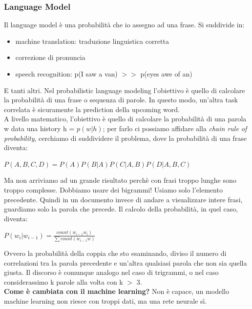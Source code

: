 \subsubsection{Language Model}
Il language model è una probabilità che io assegno ad una frase. Si suddivide in:
\begin{itemize}
    \item machine translation: traduzione linguistica corretta
    \item correzione di pronuncia 
    \item speech recognition: p(I saw a van) $>>$ p(eyes awe of an)
\end{itemize}
E tanti altri. Nel probabilistic language modeling l'obiettivo è quello di calcolare la probabilità di una frase o sequenza di parole. In questo modo, un'altra task correlata è sicuramente la prediction della upcoming word. 
\\
A livello matematico, l'obiettivo è quello di calcolare la probabilità di una parola w data una history h = $p(w|h)$; per farlo ci possiamo affidare alla \textit{chain rule of probability}, cerchiamo di suddividere il problema, dove la probabilità di una frase diventa:
\begin{center}
    \begin{math}
        P(A,B,C,D) = P(A)P(B|A)P(C|A,B)P(D|A,B,C)
    \end{math}
\end{center}
Ma non arriviamo ad un grande risultato perchè con frasi troppo lunghe sono troppo complesse. Dobbiamo usare dei bigrammi! Usiamo solo l'elemento precedente. Quindi in un documento invece di andare a visualizzare intere frasi, guardiamo solo la parola che precede. Il calcolo della probabilità, in quel caso, diventa: 
\begin{center}
    \begin{math}
        P(w_i | w_{i-1}) = \frac{count(w_{i-1}w_i)}{\sum count(w_{i-1}w)}
    \end{math}
\end{center}
Ovvero la probabilità della coppia che sto esaminando, diviso il numero di correlazioni tra la parola precedente e un'altra qualsiasi parola che non sia quella giusta. Il discorso è comunque analogo nel caso di trigrammi, o nel caso considerassimo k parole alla volta con k $>$ 3. 
\\
\textbf{Come è cambiata con il machine learning?} Non è capace, un modello machine learning non riesce con troppi dati, ma una rete neurale sì. 
\\
